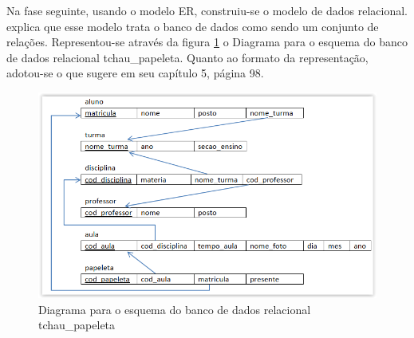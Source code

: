 Na fase seguinte, usando o modelo ER, construiu-se o modelo de dados relacional. \citep{bd} explica que esse modelo trata o banco de dados como sendo um conjunto de relações. Representou-se através da figura  \ref{fig:figura60ab} o Diagrama para o esquema do banco de dados relacional tchau\_papeleta.  Quanto ao formato da representação, adotou-se o que \citep{bd} sugere em seu capítulo 5, página 98.  

\begin{figure}[!ht]
	\centering
\includegraphics[width=1\textwidth]{img/relacional.PNG}   
	\caption{Diagrama para o esquema do banco de dados relacional tchau\_papeleta}
	\label{fig:figura60ab}
\end{figure}

